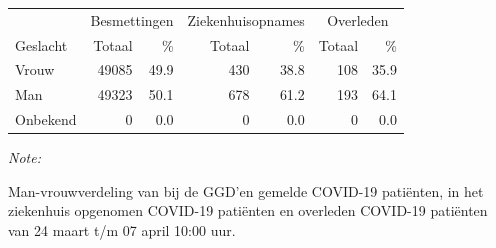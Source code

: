 \documentclass[
  english,
  man,floatsintext]{apa6}
\begin{document}
\begin{table}
\centering\begingroup\fontsize{11}{13}\selectfont

\begin{threeparttable}
\begin{tabular}{lrrrrrr}
\toprule
\multicolumn{1}{c}{ } & \multicolumn{2}{c}{Besmettingen} & \multicolumn{2}{c}{Ziekenhuisopnames} & \multicolumn{2}{c}{Overleden} \\
\cmidrule(l{3pt}r{3pt}){2-3} \cmidrule(l{3pt}r{3pt}){4-5} \cmidrule(l{3pt}r{3pt}){6-7}
Geslacht & Totaal & \% & Totaal & \% & Totaal & \%\\
\midrule
Vrouw & 49085 & 49.9 & 430 & 38.8 & 108 & 35.9\\
Man & 49323 & 50.1 & 678 & 61.2 & 193 & 64.1\\
Onbekend & 0 & 0.0 & 0 & 0.0 & 0 & 0.0\\
\bottomrule
\end{tabular}
\begin{tablenotes}
\item \textit{Note: } 
\item Man-vrouwverdeling van bij de GGD’en gemelde COVID-19 patiënten, in het ziekenhuis opgenomen COVID-19 patiënten en overleden COVID-19 patiënten van 24 maart t/m 07 april 10:00 uur.
\end{tablenotes}
\end{threeparttable}
\endgroup{}
\end{table}
\newpage
\end{document}
